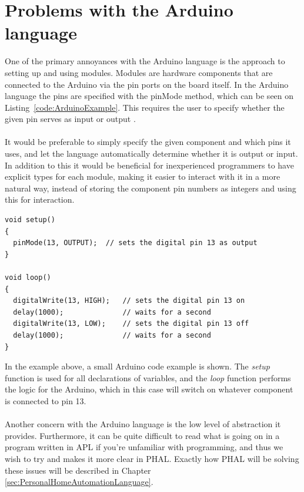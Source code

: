 \section{Problems with the Arduino language}\label{ProblemA:ArduinoLanguage}
One of the primary annoyances with the Arduino language is the approach to setting up and using modules. Modules are hardware components that are connected to the Arduino via the pin ports on the board itself. In the Arduino language the pins are specified with the pinMode method, which can be seen on Listing~\ref{code:ArduinoExample}. This requires the user to specify whether the given pin serves as input or output \cite{FiveCommonArduinoMistakes}.
\\\\
It would be preferable to simply specify the given component and which pins it uses, and let the language automatically determine whether it is output or input. 
In addition to this it would be beneficial for inexperienced programmers to have explicit types for each module, making it easier to interact with it in a more natural way, instead of storing the component pin numbers as integers and using this for interaction.
\\
\begin{lstlisting}[caption={Example of Arduino code showing the use of \textit{pinMode} and \textit{digitalWrite} \cite{BeginningArduino}.},label={code:ArduinoExample}]
void setup()
{
  pinMode(13, OUTPUT);  // sets the digital pin 13 as output
}

void loop()
{
  digitalWrite(13, HIGH);   // sets the digital pin 13 on
  delay(1000);              // waits for a second
  digitalWrite(13, LOW);    // sets the digital pin 13 off
  delay(1000);              // waits for a second
}
\end{lstlisting}
In the example above, a small Arduino code example is shown. The \textit{setup} function is used for all declarations of variables, and the \textit{loop} function performs the logic for the Arduino, which in this case will switch on whatever component is connected to pin 13.
\\\\
Another concern with the Arduino language is the low level of abstraction it provides. Furthermore, it can be quite difficult to read what is going on in a program written in APL if you're unfamiliar with programming, and thus we wish to try and makes it more clear in PHAL. Exactly how PHAL will be solving these issues will be described in Chapter \ref{sec:PersonalHomeAutomationLanguage}.

